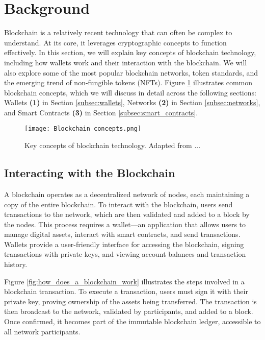 \section{Background}
\label{sec:background}

Blockchain is a relatively recent technology that can often be complex to
understand. At its core, it leverages cryptographic concepts to function
effectively. In this section, we will explain key concepts of blockchain
technology, including how wallets work and their interaction with the
blockchain. We will also explore some of the most popular blockchain networks,
token standards, and the emerging trend of non-fungible tokens (NFTs). Figure
\ref{fig:blockchain_concepts} illustrates common blockchain concepts, which we
will discuss in detail across the following sections: Wallets \textbf{(1)} in
Section \ref{subsec:wallets}, Networks \textbf{(2)} in Section
\ref{subsec:networks}, and Smart Contracts \textbf{(3)} in Section
\ref{subsec:smart_contracts}.

\begin{figure}[H]
    \centering
    \texttt{[image: Blockchain concepts.png]}
    \caption[Blockchain concepts]{Key concepts of blockchain technology. Adapted from ...}
    \label{fig:blockchain_concepts}
\end{figure}

\subsection{Interacting with the Blockchain}
\label{subsec:interacting_with_the_blockchain}

A blockchain operates as a decentralized network of nodes, each maintaining a
copy of the entire blockchain. To interact with the blockchain, users send
transactions to the network, which are then validated and added to a block by
the nodes. This process requires a wallet—an application that allows users to
manage digital assets, interact with smart contracts, and send transactions.
Wallets provide a user-friendly interface for accessing the blockchain, signing
transactions with private keys, and viewing account balances and transaction
history.

Figure \ref{fig:how_does_a_blockchain_work} illustrates the steps involved in a
blockchain transaction. To execute a transaction, users must sign it with their
private key, proving ownership of the assets being transferred. The transaction
is then broadcast to the network, validated by participants, and added to a
block. Once confirmed, it becomes part of the immutable blockchain ledger,
accessible to all network participants.

